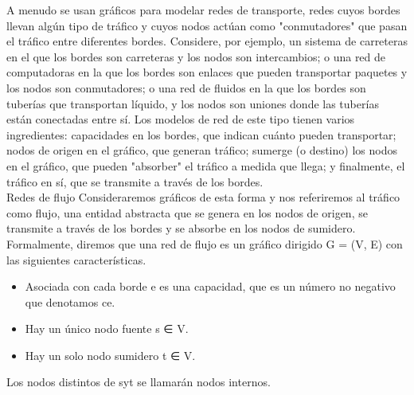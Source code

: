 \documentclass[a4paper]{article}
\begin{document}
A menudo se usan gráficos para modelar redes de transporte, redes cuyos bordes llevan algún tipo de tráfico y cuyos nodos actúan como "conmutadores" que pasan el tráfico entre diferentes bordes. Considere, por ejemplo, un sistema de carreteras en el que los bordes son carreteras y los nodos son intercambios; o una red de computadoras en la que los bordes son enlaces que pueden transportar paquetes y los nodos son conmutadores; o una red de fluidos en la que los bordes son tuberías que transportan líquido, y los nodos son uniones donde las tuberías están conectadas entre sí. Los modelos de red de este tipo tienen varios ingredientes: capacidades en los bordes, que indican cuánto pueden transportar; nodos de origen en el gráfico, que generan tráfico; sumerge (o destino) los nodos en el gráfico, que pueden "absorber" el tráfico a medida que llega; y finalmente, el tráfico en sí, que se transmite a través de los bordes.\\

Redes de flujo Consideraremos gráficos de esta forma y nos referiremos al tráfico como flujo, una entidad abstracta que se genera en los nodos de origen, se transmite a través de los bordes y se absorbe en los nodos de sumidero. Formalmente, diremos que una red de flujo es un gráfico dirigido G = (V, E) con las siguientes características.\\

\begin{itemize}
    \item Asociada con cada borde e es una capacidad, que es un número no negativo que denotamos ce.
    \item Hay un único nodo fuente s ∈ V.
    \item Hay un solo nodo sumidero t ∈ V.
\end{itemize}

Los nodos distintos de syt se llamarán nodos internos.
\end{document}
